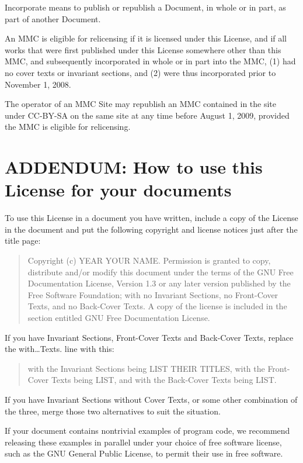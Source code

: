 \documentclass[captions=tableheading]{scrbook}
\begin{document}
Incorporate means to publish or republish a Document, in whole or in part, as part of another Document.

An MMC is eligible for relicensing if it is licensed under this License, and if all works that were first published under this License somewhere other than this MMC, and subsequently incorporated in whole or in part into the MMC, (1) had no cover texts or invariant sections, and (2) were thus incorporated prior to November 1, 2008.

The operator of an MMC Site may republish an MMC contained in the site under CC-BY-SA on the same site at any time before August 1, 2009, provided the MMC is eligible for relicensing.
\section{ADDENDUM: How to use this License for your documents}
\label{sec-18-13}


To use this License in a document you have written, include a copy of the License in the document and put the following copyright and license notices just after the title page: 

\begin{quote}
\noindent Copyright (c) YEAR YOUR NAME. Permission is granted to copy, distribute and/or modify this document under the terms of the GNU Free Documentation License, Version 1.3 or any later version published by the Free Software Foundation; with no Invariant Sections, no Front-Cover Texts, and no Back-Cover Texts. A copy of the license is included in the section entitled GNU Free Documentation License.
\end{quote}

If you have Invariant Sections, Front-Cover Texts and Back-Cover Texts, replace the with\ldots{}Texts. line with this:

\begin{quote}
\noindent with the Invariant Sections being LIST THEIR TITLES, with the Front-Cover Texts being LIST, and with the Back-Cover Texts being LIST.
\end{quote}

If you have Invariant Sections without Cover Texts, or some other combination of the three, merge those two alternatives to suit the situation.

If your document contains nontrivial examples of program code, we recommend releasing these examples in parallel under your choice of free software license, such as the GNU General Public License, to permit their use in free software. 
\end{document}

